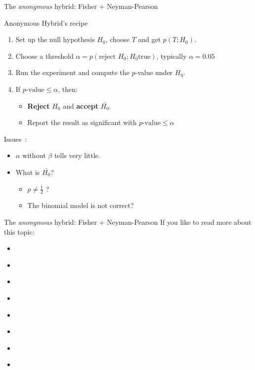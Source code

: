 \documentclass[aspectratio=169]{beamer}
\begin{document}
\begin{frame}{The \emph{anonymous} hybrid: Fisher + Neyman-Pearson}
  \begin{block}{Anonymous Hybrid's recipe}
    \begin{enumerate}
    \item Set up the null hypothesis $H_0$, choose $T$ and get $p(T;H_0)$.
    \item Choose a threshold $\alpha = p(\text{reject } H_0; H_0 \text{
        true})$, typically $\alpha = 0.05$
    \item Run the experiment and compute the $p$-value under $H_0$.
    \item If $p\text{-value} \leq \alpha$, then:
      \begin{itemize}
      \item \textbf{Reject} $H_0$ and \textbf{accept} $\bar{H_0}$.
      \item Report the result as significant with $p\text{-value} \leq \alpha$
      \end{itemize}
    \end{enumerate}
  \end{block}
  Issues~\cite{goodman2008dirty}:
  \begin{itemize}
  \item $\alpha$ without $\beta$ tells very little. %
  \item What is $\bar{H_0}$?
    \begin{itemize}
    \item $p \neq \frac{1}{2}$ ?
    \item The binomial model is not correct?
    \end{itemize}
  \end{itemize}
\end{frame}


\begin{frame}{The \emph{anonymous} hybrid: Fisher + Neyman-Pearson}
  If you like to read more about this topic:
  \begin{itemize}
  \item \cite{gill1999insignificance}
  \item \cite{gigerenzer2004mindless}
  \item \cite{gigerenzer2004null}
  \item \cite{goodman1999toward1,goodman1999toward2}
  \item \cite{hubbard2003confusion}
  \item \cite{berger1987testing}
  \item \cite{sellke2001calibration}
  \item \cite{goodman2008dirty}
  \end{itemize}
\end{frame}
\end{document}

